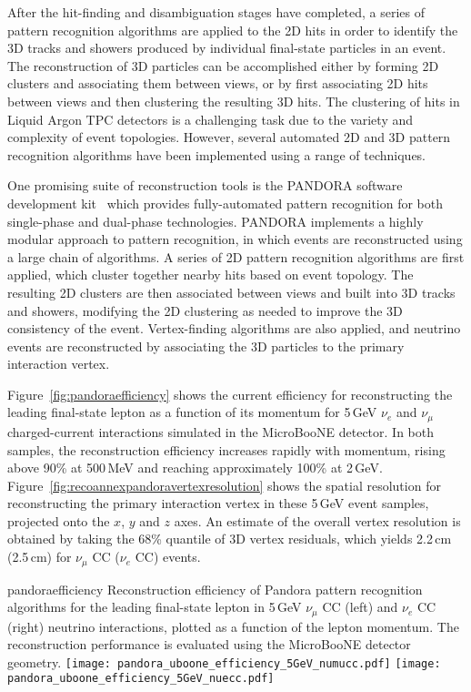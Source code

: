 After the hit-finding and disambiguation stages have completed, a series of 
pattern recognition algorithms are applied to the 2D hits in order to identify 
the 3D tracks and showers produced by individual final-state particles in an event.
The reconstruction of 3D particles can be accomplished either by forming 2D clusters
and associating them between views, or by first associating 2D hits between views
and then clustering the resulting 3D hits. 
The clustering of hits in Liquid Argon TPC detectors is a challenging task
due to the variety and complexity of event topologies.
However, several automated 2D and 3D pattern recognition algorithms have been 
implemented using a range of techniques.

One promising suite of reconstruction tools is the 
PANDORA software development kit~\cite{Marshall:2013bda,Marshall:2012hh}
which provides fully-automated pattern recognition for both single-phase 
and dual-phase technologies. 
PANDORA implements a highly modular approach to pattern recognition,
in which events are reconstructed using a large chain of algorithms. 
A series of 2D pattern recognition algorithms are first applied,
which cluster together nearby hits based on event topology.
The resulting 2D clusters are then associated between views
and built into 3D tracks and showers, modifying the 2D clustering 
as needed to improve the 3D consistency of the event. 
Vertex-finding algorithms are also applied,
and neutrino events are reconstructed by associating the 
3D particles to the primary interaction vertex.

Figure~\ref{fig:pandoraefficiency} shows the current efficiency for reconstructing
the leading final-state lepton as a function of its momentum
for 5\,GeV $\nu_{e}$ and $\nu_{\mu}$ charged-current interactions
simulated in the MicroBooNE detector.
In both samples, the reconstruction efficiency increases rapidly with momentum,
rising above 90\% at 500\,MeV and reaching approximately 100\% at 2\,GeV.
Figure~\ref{fig:recoannexpandoravertexresolution} shows the spatial resolution for
reconstructing the primary interaction vertex in these 5\,GeV event samples,
projected onto the $x$, $y$ and $z$ axes. An estimate of the overall vertex 
resolution is obtained by taking the 68\% quantile of 3D vertex residuals, 
which yields 2.2\,cm (2.5\,cm) for $\nu_{\mu}$ CC ($\nu_{e}$ CC) events.

\begin{cdrfigure}{pandoraefficiency}
{Reconstruction efficiency of Pandora pattern recognition algorithms
 for the leading final-state lepton in 5\,GeV $\nu_{\mu}$ CC (left) and
 $\nu_{e}$ CC (right) neutrino interactions, plotted as a function of
 the lepton momentum. The reconstruction performance is evaluated
 using the MicroBooNE detector geometry. }
\texttt{[image: pandora\_uboone\_efficiency\_5GeV\_numucc.pdf]}
\texttt{[image: pandora\_uboone\_efficiency\_5GeV\_nuecc.pdf]}
\end{cdrfigure}

